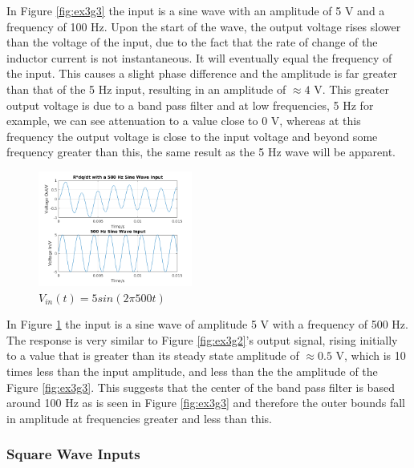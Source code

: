 \documentclass[11pt,a4paper]{article}
\begin{document}
\vspace{6mm}In Figure \ref{fig:ex3g3} the input is a sine wave with an amplitude of 5 V and a frequency of 100 Hz. Upon the start of the wave, the output voltage rises slower than the voltage of the input, due to the fact that the rate of change of the inductor current is not instantaneous. It will eventually equal the frequency of the input. This causes a slight phase difference and the amplitude is far greater than that of the 5 Hz input, resulting in an amplitude of $\approx 4$ V. This greater output voltage is due to a band pass filter and at low frequencies, 5 Hz for example, we can see attenuation to a value close to 0 V, whereas at this frequency the output voltage is close to the input voltage and beyond some frequency greater than this, the same result as the 5 Hz wave will be apparent.

\begin{figure}
    \vspace{-33mm}
  		\includegraphics[width=0.45\textwidth]{Ex3_Figs/500Sine.png}
	\vspace{-3mm}
  	\caption{$V_{in}(t)= 5sin(2 \pi 500t)$}
  	\label{fig:ex3g4}
\end{figure}

\vspace{2mm}In Figure \ref{fig:ex3g4} the input is a sine wave of amplitude 5 V with a frequency of 500 Hz. The response is very similar to Figure \ref{fig:ex3g2}'s output signal, rising initially to a value that is greater than its steady state amplitude of $\approx 0.5$ V, which is 10 times less than the input amplitude, and less than the the amplitude of the Figure \ref{fig:ex3g3}. This suggests that the center of the band pass filter is based around 100 Hz as is seen in Figure \ref{fig:ex3g3} and therefore the outer bounds fall in amplitude at frequencies greater and less than this.

\subsubsection{Square Wave Inputs}
\end{document}

